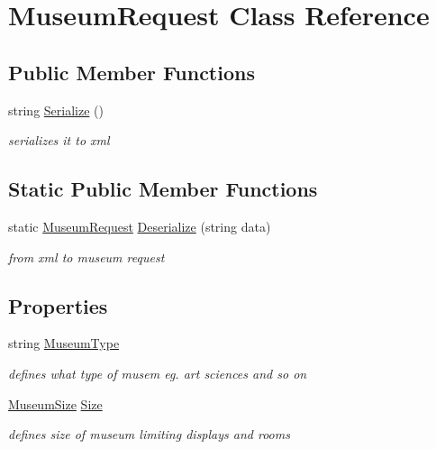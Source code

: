 \hypertarget{class_museum_request}{}\section{Museum\+Request Class Reference}
\label{class_museum_request}
\subsection*{Public Member Functions}
\begin{DoxyCompactItemize}
\item 
string \mbox{\hyperlink{class_museum_request_ae227bce4871f20bf6661db4a5af5fe1c}{Serialize}} ()
\begin{DoxyCompactList}\small\item\em serializes it to xml \end{DoxyCompactList}\end{DoxyCompactItemize}
\subsection*{Static Public Member Functions}
\begin{DoxyCompactItemize}
\item 
static \mbox{\hyperlink{class_museum_request}{Museum\+Request}} \mbox{\hyperlink{class_museum_request_abd551a45744c8387841c20e5ef46d420}{Deserialize}} (string data)
\begin{DoxyCompactList}\small\item\em from xml to museum request \end{DoxyCompactList}\end{DoxyCompactItemize}
\subsection*{Properties}
\begin{DoxyCompactItemize}
\item 
string \mbox{\hyperlink{class_museum_request_a55a4ab7c95751f54af3f8ced9d81ba76}{Museum\+Type}}
\begin{DoxyCompactList}\small\item\em defines what type of musem eg. art sciences and so on \end{DoxyCompactList}\item 
\mbox{\hyperlink{_mueseum_request_8cs_a462fa84e99cf703318040e54f14146a2}{Museum\+Size}} \mbox{\hyperlink{class_museum_request_a82207d17f80d3a624e7784ffe21c6f43}{Size}}
\begin{DoxyCompactList}\small\item\em defines size of museum limiting displays and rooms \end{DoxyCompactList}\end{DoxyCompactItemize}



